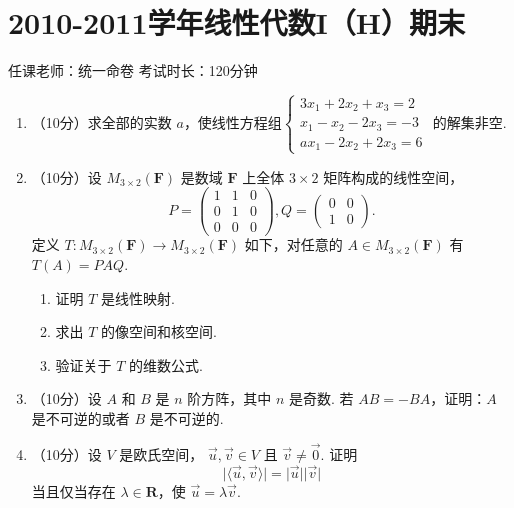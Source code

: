 \section{2010-2011学年线性代数I（H）期末}

\begin{center}
    任课老师：统一命卷\hspace{4em} 考试时长：120分钟
\end{center}

\begin{enumerate}
    \item （10分）求全部的实数 $a$，使线性方程组$\begin{cases} 3x_1+2x_2+x_3=2 \\ x_1-x_2-2x_3=-3 \\ ax_1-2x_2+2x_3 = 6\end{cases}$ 的解集非空.

    \item （10分）设 $M_{3\times2} (\mathbf{F})$ 是数域 $\mathbf{F}$ 上全体 $3\times 2$ 矩阵构成的线性空间，
    \[P = \begin{pmatrix}1 & 1 & 0 \\ 0 & 1 & 0 \\ 0 & 0 & 0\end{pmatrix},Q=\begin{pmatrix}0 & 0 \\ 1 & 0\end{pmatrix}.\]
    定义 $T\colon M_{3\times 2}(\mathbf{F}) \to M_{3\times2} (\mathbf{F})$ 如下，对任意的 $A\in M_{3\times2}(\mathbf{F})$ 有 $T(A) = PAQ$.
    \begin{enumerate}
        \item 证明 $T$ 是线性映射.

        \item 求出 $T$ 的像空间和核空间.

        \item 验证关于 $T$ 的维数公式.
    \end{enumerate}

    \item （10分）设 $A$ 和 $B$ 是 $n$ 阶方阵，其中 $n$ 是奇数. 若 $AB=-BA$，证明：$A$ 是不可逆的或者 $B$ 是不可逆的.

    \item （10分）设 $V$ 是欧氏空间， $\vec{u},\vec{v}\in V$ 且 $\vec{v} \neq \vec{0}$.  证明
    \[\lvert\langle\vec{u},\vec{v}\rangle\rvert =\lvert \vec{u} \rvert \lvert \vec{v} \rvert \]
    当且仅当存在 $\lambda \in \mathbf{R}$，使 $\vec{u} = \lambda \vec{v}$.


\end{enumerate}
